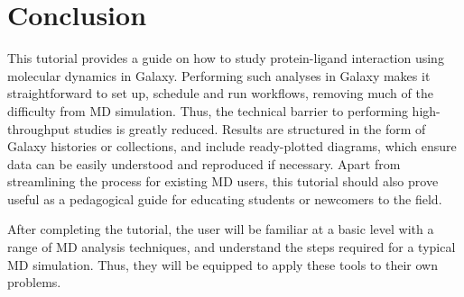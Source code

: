 \documentclass[twocolumn]{bmcart}%
\begin{document}
\hypertarget{conclusion}{%
\section*{Conclusion}\label{conclusion}}

This tutorial provides a guide on how to study protein-ligand interaction using molecular dynamics in Galaxy. Performing such analyses in Galaxy makes it straightforward to set up, schedule and run workflows, removing much of the difficulty from MD simulation. Thus, the technical barrier to performing high-throughput studies is greatly reduced. Results are structured in the form of Galaxy histories or collections, and include ready-plotted diagrams, which ensure data can be easily understood and reproduced if necessary. Apart from streamlining the process for existing MD users, this tutorial should also prove useful as a pedagogical guide for educating students or newcomers to the field.

After completing the tutorial, the user will be familiar at a basic level with a range of MD analysis techniques, and understand the steps required for a typical MD simulation. Thus, they will be equipped to apply these tools to their own problems.



\end{document}
